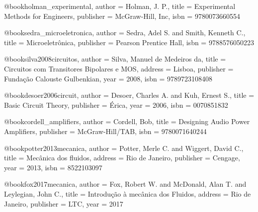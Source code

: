 @book{holman_experimental,
  author = {Holman, J. P.},
  title = {Experimental Methods for Engineers},
  publisher = {McGraw-Hill, Inc},
  isbn = {9780073660554}
}

%

@book{sedra_microeletronica,
  author = {Sedra, Adel S. and Smith, Kenneth C.},
  title = {Microeletrônica},
  publisher = {Pearson Prentice Hall},
  isbn = {9788576050223}
}

@book{silva2008circuitos,
  author = {Silva, Manuel de Medeiros da},
  title = {Circuitos com Transitores Bipolares e MOS},
  address = {Lisboa},
  publisher = {Fundação Calouste Gulbenkian},
  year = {2008},
  isbn = {9789723108408}
}

@book{desoer2006circuit,
  author = {Desoer, Charles A. and Kuh, Ernest S.},
  title = {Basic Circuit Theory},
  publisher = {Érica},
  year = {2006},
  isbn = {0070851832}
}

@book{cordell_amplifiers,
  author = {Cordell, Bob},
  title = {Designing Audio Power Amplifiers},
  publisher = {McGraw-Hill/TAB},
  isbn = {9780071640244}
}

%

@book{potter2013mecanica,
  author = {Potter, Merle C. and Wiggert, David C.},
  title = {Mecânica dos fluidos},
  address = {Rio de Janeiro},
  publisher = {Cengage},
  year = {2013},
  isbn = {8522103097}
}

@book{fox2017mecanica,
  author = {Fox, Robert W. and McDonald, Alan T. and Leylegian, John C.},
  title = {Introdução à mecânica dos Fluidos},
  address = {Rio de Janeiro},
  publisher = {LTC},
  year = {2017}
}

